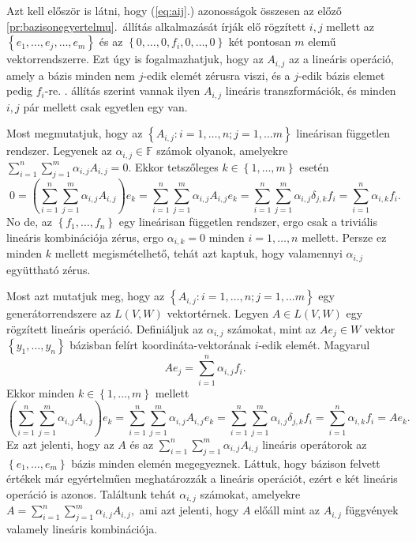 \documentclass[9pt, a4paper, showtrims]{memoir}
\makeatletter
\let\Aref\relax
\renewenvironment{proof}[1][\proofname]
    {\par\pushQED{\qed}%
    \normalfont \topsep6\p@\@plus6\p@\relax
    \trivlist
    \item[\hskip\labelsep
        \itshape
    #1\@addpunct{:}]\ignorespaces}
    {\popQED\endtrivlist\@endpefalse}
\theoremstyle{plain}
\theoremstyle{remark}
\theoremstyle{definition}
\makeatother
\begin{document}
\begin{proof}
	Azt kell először is látni, hogy (\ref{eq:aij}.) azonosságok összesen az előző \ref{pr:bazisonegyertelmu}.~állítás
	alkalmazását írják elő rögzített $i,j$ mellett az
	\begin{math}
		\left\{ e_1,\ldots,e_j,\ldots,e_m \right\}
	\end{math}
	és az
	\begin{math}
		\left\{ 0,\ldots,0,f_i,0,\ldots,0 \right\}
	\end{math}
	két pontosan $m$ elemű vektorrendszerre.
	Ezt úgy is fogalmazhatjuk, hogy az $A_{i,j}$ az a lineáris operáció,
	amely a bázis minden nem $j$-edik elemét zérusra viszi, és a $j$-edik bázis elemet
	pedig $f_i$-re.
	\Aref{pr:bazisonegyertelmu}. állítás szerint vannak ilyen $A_{i,j}$ lineáris transzformációk,
	és minden $i,j$ pár mellett csak egyetlen egy van.

	Most megmutatjuk, hogy az $\left\{ A_{i,j}:i=1,\ldots,n;j=1,\dots m \right\}$ lineárisan független
	rendszer.
	Legyenek az $\alpha_{i,j}\in\mathbb{F}$ számok olyanok,
	amelyekre
	\begin{math}
		\sum_{i=1}^n\sum_{j=1}^m\alpha_{i,j}A_{i,j}=0.
	\end{math}
	Ekkor tetszőleges $k\in\left\{ 1,\ldots,m \right\}$ esetén
	\[
		0=
		\left( \sum_{i=1}^n\sum_{j=1}^m\alpha_{i,j}A_{i,j} \right)e_k
		=
		\sum_{i=1}^n\sum_{j=1}^m\alpha_{i,j}A_{i,j}e_k
		=
		\sum_{i=1}^n\sum_{j=1}^m\alpha_{i,j}\delta_{j,k}f_i
		=
		\sum_{i=1}^n\alpha_{i,k}f_i.
	\]
	No de, az $\left\{f_1,\ldots,f_n  \right\}$ egy lineárisan független rendszer,
	ergo csak a  triviális lineáris kombinációja zérus,
	ergo $\alpha_{i,k}=0$ minden $i=1,\ldots,n$ mellett.
	Persze ez minden $k$ mellett megismételhető, tehát azt kaptuk, hogy valamennyi $\alpha_{i,j}$ együttható
	zérus.

	Most azt mutatjuk meg, hogy az $\left\{ A_{i,j}:i=1,\ldots,n;j=1,\dots m \right\}$ egy
	generátorrendszere az $L\left( V,W \right)$ vektortérnek.
	Legyen $A\in L\left( V,W \right)$ egy rögzített lineáris operáció.
	Definiáljuk az $\alpha_{i,j}$ számokat,
	mint az $Ae_{j}\in W$ vektor $\left\{ y_1,\ldots,y_n \right\}$ bázisban felírt koordináta-vektorának
	$i$-edik elemét.
	Magyarul
	\[
		Ae_j=
		\sum_{i=1}^n\alpha_{i,j}f_i.
	\]
	Ekkor minden $k\in\left\{ 1,\ldots,m \right\}$ mellett
	\[
		\left( \sum_{i=1}^n\sum_{j=1}^m\alpha_{i,j}A_{i,j} \right)e_k
		=
		\sum_{i=1}^n\sum_{j=1}^m\alpha_{i,j}A_{i,j}e_k
		=
		\sum_{i=1}^n\sum_{j=1}^m\alpha_{i,j}\delta_{j,k}f_i
		=
		\sum_{i=1}^n\alpha_{i,k}f_i
		=Ae_k.
	\]
	Ez azt jelenti, hogy az $A$ és az
	\begin{math}
		\sum_{i=1}^n\sum_{j=1}^m\alpha_{i,j}A_{i,j}
	\end{math}
	lineáris operátorok az $\left\{ e_1,\ldots,e_m \right\}$ bázis minden elemén megegyeznek.
	Láttuk, hogy bázison felvett értékek már egyértelműen meghatározzák a lineáris operációt,
	ezért e két lineáris operáció is azonos.
	Találtunk tehát $\alpha_{i,j}$ számokat, amelyekre
	\begin{math}
		A=
		\sum_{i=1}^n\sum_{j=1}^m\alpha_{i,j}A_{i,j},
	\end{math}
	ami azt jelenti, hogy $A$ előáll mint az $A_{i,j}$ függvények valamely lineáris kombinációja.
\end{proof}
\end{document}
